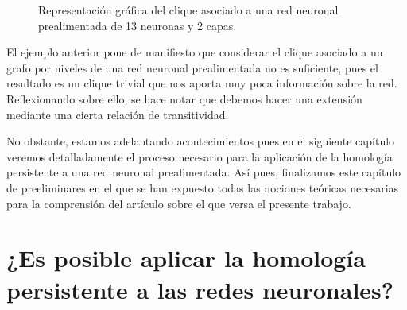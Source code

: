 \documentclass[12pt, a4paper, twoside]{book}
\numberwithin{equation}{section}
\theoremstyle{definition}
\newenvironment{ejem}
  {\pushQED{\qed}\renewcommand{\qedsymbol}{$\blacktriangleleft$}\ejemplo}
  {\popQED\endejemplo}
\theoremstyle{remark}
\theoremstyle{plain}
\begin{document}
\begin{ejem}
\begin{figure}[!htbp]
			\caption{Representación gráfica del clique asociado a una red neuronal prealimentada de 13 neuronas y 2 capas.}
			\label{fig:cliqueEjem}
		\end{figure}
	\end{ejem}

	El ejemplo anterior pone de manifiesto que considerar el clique 
	asociado a un grafo por niveles de una red neuronal prealimentada no 
	es suficiente, pues el resultado es un clique trivial que nos aporta 
	muy poca información sobre la red. Reflexionando sobre ello, se hace 
	notar que debemos hacer una extensión mediante una cierta relación de 
	transitividad. 

	No obstante, estamos adelantando acontecimientos pues en el siguiente 
	capítulo veremos detalladamente el proceso necesario para la 
	aplicación de la homología persistente a una red neuronal 
	prealimentada. Así pues, finalizamos este capítulo de preeliminares en
	el que se han expuesto todas las nociones teóricas necesarias para la 
	comprensión del artículo sobre el que versa el presente trabajo.

	\newpage

	\chapter{¿Es posible aplicar la homología persistente a las redes 
	neuronales?}
	
\end{document}

